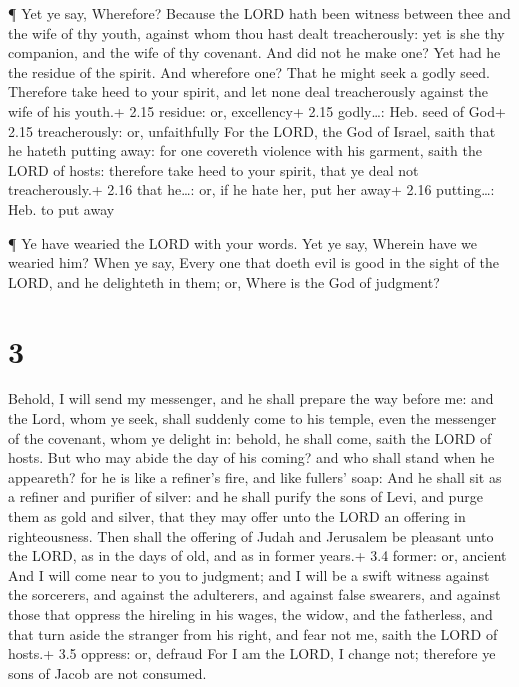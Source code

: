  ¶ Yet ye say, Wherefore? Because the LORD hath been
witness between thee and the wife of thy youth, against whom thou hast
dealt treacherously: yet is she thy companion, and the wife of thy
covenant.  And did not he make one? Yet had he the residue
of the spirit. And wherefore one? That he might seek a godly seed.
Therefore take heed to your spirit, and let none deal treacherously
against the wife of his youth.+ 2.15 residue: or, excellency+ 2.15
godly\ldots: Heb. seed of God+ 2.15 treacherously: or, unfaithfully
 For the LORD, the God of Israel, saith that he hateth
putting away: for one covereth violence with his garment, saith the LORD
of hosts: therefore take heed to your spirit, that ye deal not
treacherously.+ 2.16 that he\ldots: or, if he hate her, put her away+
2.16 putting\ldots: Heb. to put away

 ¶ Ye have wearied the LORD with your words. Yet ye say,
Wherein have we wearied him? When ye say, Every one that doeth evil is
good in the sight of the LORD, and he delighteth in them; or, Where is
the God of judgment?

\hypertarget{section-2}{%
\section{3}\label{section-2}}

 Behold, I will send my messenger, and he shall prepare the
way before me: and the Lord, whom ye seek, shall suddenly come to his
temple, even the messenger of the covenant, whom ye delight in: behold,
he shall come, saith the LORD of hosts.  But who may abide
the day of his coming? and who shall stand when he appeareth? for he is
like a refiner's fire, and like fullers' soap:  And he shall
sit as a refiner and purifier of silver: and he shall purify the sons of
Levi, and purge them as gold and silver, that they may offer unto the
LORD an offering in righteousness.  Then shall the offering
of Judah and Jerusalem be pleasant unto the LORD, as in the days of old,
and as in former years.+ 3.4 former: or, ancient  And I will
come near to you to judgment; and I will be a swift witness against the
sorcerers, and against the adulterers, and against false swearers, and
against those that oppress the hireling in his wages, the widow, and the
fatherless, and that turn aside the stranger from his right, and fear
not me, saith the LORD of hosts.+ 3.5 oppress: or, defraud 
For I am the LORD, I change not; therefore ye sons of Jacob are not
consumed.

